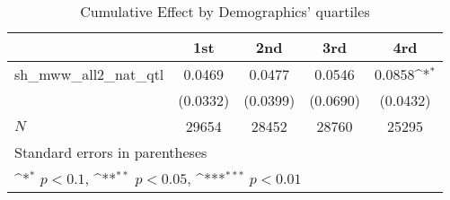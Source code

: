 \begin{table}[htbp]\centering
\def\sym#1{\ifmmode^{#1}\else\(^{#1}\)\fi}
\caption{Cumulative Effect by Demographics' quartiles}
\begin{tabular}{l*{4}{c}}
\hline\hline
            &\multicolumn{1}{c}{1st}&\multicolumn{1}{c}{2nd}&\multicolumn{1}{c}{3rd}&\multicolumn{1}{c}{4rd}\\
\hline
sh\_mww\_all2\_nat\_qtl&      0.0469         &      0.0477         &      0.0546         &      0.0858\sym{*}  \\
            &    (0.0332)         &    (0.0399)         &    (0.0690)         &    (0.0432)         \\
\hline
\(N\)       &       29654         &       28452         &       28760         &       25295         \\
\hline\hline
\multicolumn{5}{l}{\footnotesize Standard errors in parentheses}\\
\multicolumn{5}{l}{\footnotesize \sym{*} \(p<0.1\), \sym{**} \(p<0.05\), \sym{***} \(p<0.01\)}\\
\end{tabular}
\end{table}
